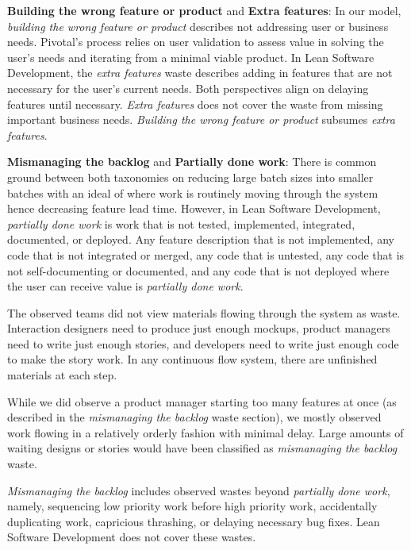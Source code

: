 \textbf{Building the wrong feature or product} and \textbf{Extra features}: In our model, \textit{building the wrong feature or product} describes not addressing user or business needs. Pivotal's process relies on user validation to assess value in solving the user's needs and iterating from a minimal viable product. In Lean Software Development, the \textit{extra features} waste describes adding in features that are not necessary for the user's current needs. Both perspectives align on delaying features until necessary. \textit{Extra features} does not cover the waste from missing important business needs. \textit{Building the wrong feature or product} subsumes \textit{extra features}.

\textbf{Mismanaging the backlog} and \textbf{Partially done work}: There is common ground between both taxonomies on reducing large batch sizes into smaller batches with an ideal of   where work is routinely moving through the system hence decreasing feature lead time. However, in Lean Software Development, \textit{partially done work} is work that is not tested, implemented, integrated, documented, or deployed. Any feature description that is not implemented, any code that is not integrated or merged, any code that is untested, any code that is not self-documenting or documented, and any code that is not deployed where the user can receive value is \textit{partially done work}.

The observed teams did not view materials flowing through the system as waste. Interaction designers need to produce just enough mockups, product managers need to write just enough stories, and developers need to write just enough code to make the story work. In any continuous flow system, there are unfinished materials at each step. 

While we did observe a product manager starting too many features at once (as described in the \textit{mismanaging the backlog} waste section), we mostly observed work flowing in a relatively orderly fashion with minimal delay. Large amounts of waiting designs or stories would have been classified as \textit{mismanaging the backlog} waste.

\textit{Mismanaging the backlog} includes observed wastes beyond \textit{partially done work}, namely,  sequencing low priority work before high priority work, accidentally duplicating work, capricious thrashing, or delaying necessary bug fixes. Lean Software Development does not cover these wastes. 


